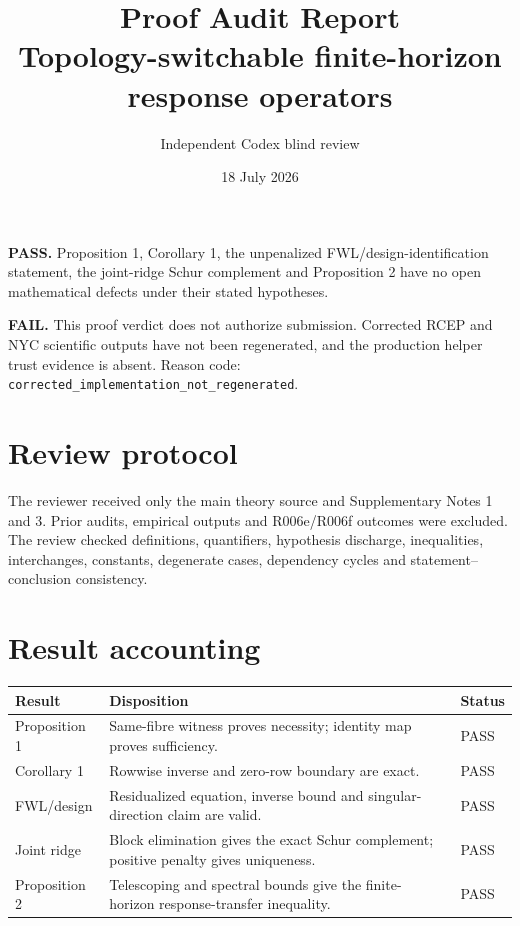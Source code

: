 \documentclass[10pt]{article}
\title{Proof Audit Report\\Topology-switchable finite-horizon response operators}
\author{Independent Codex blind review}
\date{18 July 2026}
\begin{document}
\maketitle

\begin{passbox}
\textbf{PASS.} Proposition 1, Corollary 1, the unpenalized FWL/design-identification statement, the joint-ridge Schur complement and Proposition 2 have no open mathematical defects under their stated hypotheses.
\end{passbox}

\begin{blockbox}
\textbf{FAIL.} This proof verdict does not authorize submission. Corrected RCEP and NYC scientific outputs have not been regenerated, and the production helper trust evidence is absent. Reason code: \texttt{corrected\_implementation\_not\_regenerated}.
\end{blockbox}

\section*{Review protocol}
The reviewer received only the main theory source and Supplementary Notes 1 and 3. Prior audits, empirical outputs and R006e/R006f outcomes were excluded. The review checked definitions, quantifiers, hypothesis discharge, inequalities, interchanges, constants, degenerate cases, dependency cycles and statement--conclusion consistency.

\section*{Result accounting}
\begin{tabularx}{\textwidth}{@{}lXl@{}}
\toprule
Result & Disposition & Status \\
\midrule
Proposition 1 & Same-fibre witness proves necessity; identity map proves sufficiency. & PASS \\
Corollary 1 & Rowwise inverse and zero-row boundary are exact. & PASS \\
FWL/design & Residualized equation, inverse bound and singular-direction claim are valid. & PASS \\
Joint ridge & Block elimination gives the exact Schur complement; positive penalty gives uniqueness. & PASS \\
Proposition 2 & Telescoping and spectral bounds give the finite-horizon response-transfer inequality. & PASS \\
\bottomrule
\end{tabularx}
\end{document}
